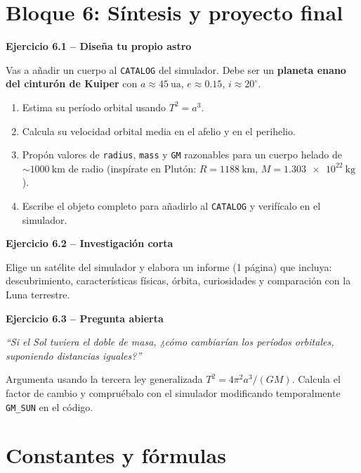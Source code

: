 \documentclass[11pt,a4paper]{article}
\newenvironment{cajaEjercicio}[1][]{\par\medskip\noindent\textbf{#1}\par\smallskip}{\par\medskip}
\theoremstyle{definition}
\begin{document}
\section{Bloque 6: Síntesis y proyecto final}

\begin{cajaEjercicio}[Ejercicio 6.1 -- Diseña tu propio astro]
Vas a añadir un cuerpo al \texttt{CATALOG} del simulador. Debe ser un \textbf{planeta enano del cinturón de Kuiper} con $a\approx\SI{45}{\astronomicalunit}$, $e\approx 0.15$, $i\approx 20^{\circ}$.
\begin{enumerate}[label=\alph*),leftmargin=*]
  \item Estima su período orbital usando $T^{2}=a^{3}$.
  \item Calcula su velocidad orbital media en el afelio y en el perihelio.
  \item Propón valores de \texttt{radius}, \texttt{mass} y \texttt{GM} razonables para un cuerpo helado de $\sim\SI{1000}{\kilo\metre}$ de radio (inspírate en Plutón: $R=\SI{1188}{\kilo\metre}$, $M=\SI{1.303e22}{\kilo\gram}$).
  \item Escribe el objeto completo para añadirlo al \texttt{CATALOG} y verifícalo en el simulador.
\end{enumerate}
\end{cajaEjercicio}

\begin{cajaEjercicio}[Ejercicio 6.2 -- Investigación corta]
Elige un satélite del simulador y elabora un informe (1 página) que incluya: descubrimiento, características físicas, órbita, curiosidades y comparación con la Luna terrestre.
\end{cajaEjercicio}

\begin{cajaEjercicio}[Ejercicio 6.3 -- Pregunta abierta]
\emph{``Si el Sol tuviera el doble de masa, ¿cómo cambiarían los períodos orbitales, suponiendo distancias iguales?''}

Argumenta usando la tercera ley generalizada $T^{2} = 4\pi^{2}a^{3}/(GM)$. Calcula el factor de cambio y compruébalo con el simulador modificando temporalmente \texttt{GM\_SUN} en el código.
\end{cajaEjercicio}

\appendix
\section{Constantes y fórmulas}\label{ap:constantes}
\end{document}
